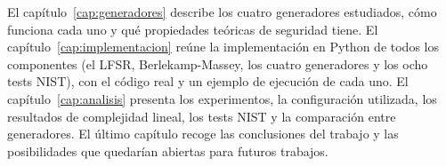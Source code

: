 El capítulo~\ref{cap:generadores} describe los cuatro generadores estudiados, cómo funciona cada uno
y qué propiedades teóricas de seguridad tiene. El capítulo~\ref{cap:implementacion} reúne la implementación en Python de todos los componentes
(el LFSR, Berlekamp-Massey, los cuatro generadores y los ocho tests NIST), con el código real y un ejemplo de ejecución de cada uno.
El capítulo~\ref{cap:analisis} presenta los experimentos, la configuración utilizada, los resultados de complejidad lineal,
los tests NIST y la comparación entre generadores. El último capítulo recoge las conclusiones del trabajo
y las posibilidades que quedarían abiertas para futuros trabajos.
